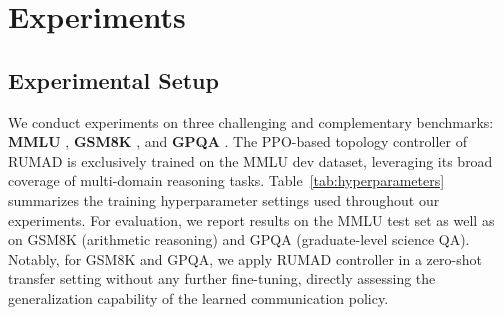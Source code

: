 
\section{Experiments}
\subsection{Experimental Setup}
\label{sec:setup}

We conduct experiments on three challenging and complementary benchmarks: \textbf{MMLU} \citep{hendrycks2020measuring}, \textbf{GSM8K} \citep{cobbe2021training}, and \textbf{GPQA} \citep{reinGPQAGraduateLevelGoogleProof2023}. The PPO-based topology controller of RUMAD is exclusively trained on the MMLU dev dataset, leveraging its broad coverage of multi-domain reasoning tasks. Table~\ref{tab:hyperparameters} summarizes the training hyperparameter settings used throughout our experiments. For evaluation, we report results on the MMLU test set as well as on GSM8K (arithmetic reasoning) and GPQA (graduate-level science QA). Notably, for GSM8K and GPQA, we apply RUMAD controller in a zero-shot transfer setting without any further fine-tuning, directly assessing the generalization capability of the learned communication policy.


